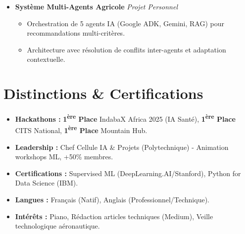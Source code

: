 \documentclass[a4paper,11pt]{article}
\begin{document}
\begin{itemize}[leftmargin=*, label={}]
\item \textbf{Système Multi-Agents Agricole} \hfill \textit{Projet Personnel}
\vspace{-2pt}
    \begin{itemize}[leftmargin=0.4cm, nosep, label=\tiny$\bullet$]
        \item \small{Orchestration de 5 agents IA (Google ADK, Gemini, RAG) pour recommandations multi-critères.}
        \item \small{Architecture avec résolution de conflits inter-agents et adaptation contextuelle.}
    \end{itemize}

\end{itemize}

\section{Distinctions \& Certifications}
\begin{itemize}[leftmargin=*, nosep]
    \item \textbf{Hackathons :} \textbf{1\textsuperscript{ère} Place} IndabaX Africa 2025 (IA Santé), \textbf{1\textsuperscript{ère} Place} CITS National, \textbf{1\textsuperscript{ère} Place} Mountain Hub.
    \item \textbf{Leadership :} Chef Cellule IA \& Projets (Polytechnique) - Animation workshops ML, +50\% membres.
    \item \textbf{Certifications :} Supervised ML (DeepLearning.AI/Stanford), Python for Data Science (IBM).
    \item \textbf{Langues :} Français (Natif), Anglais (Professionnel/Technique).
    \item \textbf{Intérêts :} Piano, Rédaction articles techniques (Medium), Veille technologique aéronautique.
\end{itemize}
\end{document}
